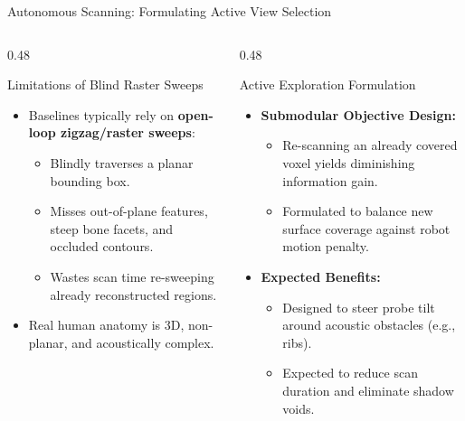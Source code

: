 \documentclass{if-beamer}
\begin{document}
\begin{frame}{Autonomous Scanning: Formulating Active View Selection}
    \begin{columns}[T]
        \begin{column}{0.48\textwidth}
            \begin{alertblock}{Limitations of Blind Raster Sweeps}
                \begin{itemize}
                    \item Baselines typically rely on \textbf{open-loop zigzag/raster sweeps}:
                    \begin{itemize}
                        \item Blindly traverses a planar bounding box.
                        \item Misses out-of-plane features, steep bone facets, and occluded contours.
                        \item Wastes scan time re-sweeping already reconstructed regions.
                    \end{itemize}
                    \item Real human anatomy is 3D, non-planar, and acoustically complex.
                \end{itemize}
            \end{alertblock}
        \end{column}
        \begin{column}{0.48\textwidth}
            \begin{block}{Active Exploration Formulation}
                \begin{itemize}
                    \item \textbf{Submodular Objective Design:}
                    \begin{itemize}
                        \item Re-scanning an already covered voxel yields diminishing information gain.
                        \item Formulated to balance new surface coverage against robot motion penalty.
                    \end{itemize}
                    \item \textbf{Expected Benefits:}
                    \begin{itemize}
                        \item Designed to steer probe tilt around acoustic obstacles (e.g., ribs).
                        \item Expected to reduce scan duration and eliminate shadow voids.

\end{itemize}
\end{itemize}
\end{block}
\end{column}
\end{columns}
\end{frame}
\end{document}

